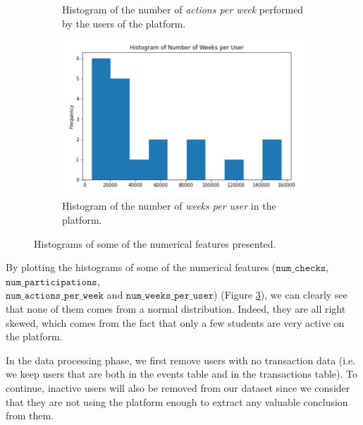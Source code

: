\documentclass[sigplan,screen]{acmart}
\begin{document}
\begin{figure}
\begin{subfigure}[b]{\linewidth}
         \caption{Histogram of the number of \emph{actions per week} performed by the users of the platform.}
         \label{fig:actions_per_week}
     \end{subfigure}
     \hfill
     \begin{subfigure}[b]{\linewidth}
         \centering
         \includegraphics[width=0.82\linewidth]{reports/figures/histogram_number_of_weeks_per_user.png}
         \caption{Histogram of the number of \emph{weeks per user} in the platform.}
         \label{fig:weeks_per_user}
     \end{subfigure}
        \caption{Histograms of some of the numerical features presented.}
        \label{fig:histograms}
\end{figure}

By plotting the histograms of some of the numerical features ($\texttt{num\_checks}$, $\texttt{num\_participations}$, \\ $\texttt{num\_actions\_per\_week}$ and $\texttt{num\_weeks\_per\_user}$) (Figure \ref{fig:histograms}), we can clearly see that none of them comes from a normal distribution. Indeed, they are all right skewed, which comes from the fact that only a few students are very active on the platform.

In the data processing phase, we first remove users with no transaction data (i.e. we keep users that are both in the events table and in the transactions table). To continue, inactive users will also be removed from our dataset since we consider that they are not using the platform enough to extract any valuable conclusion from them.
\end{document}
